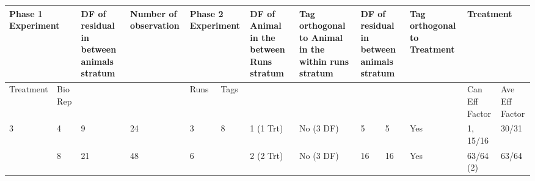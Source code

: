 \noindent 

\begin{tabular}{|p{0.5in}|p{0.3in}|p{0.5in}|p{0.7in}|p{0.3in}|p{0.3in}|p{0.7in}|p{0.7in}|p{0.3in}|p{0.3in}|p{0.6in}|p{0.5in}|p{0.4in}|} \hline 
\multicolumn{2}{|p{1in}|}{Phase 1 Experiment} & DF of residual in between animals stratum & Number of observation  & \multicolumn{2}{|p{0.7in}|}{Phase 2 Experiment} & DF of Animal in the between Runs stratum  & Tag orthogonal to Animal in the within runs stratum & \multicolumn{2}{|p{0.6in}|}{DF of residual in between animals stratum} & Tag orthogonal to Treatment & \multicolumn{2}{|p{0.9in}|}{Treatment} \\ \hline 
Treatment & Bio Rep &  &  & Runs & Tags  &  &  & \multicolumn{2}{|p{0.6in}|}{} &  & Can Eff Factor & Ave Eff Factor \\ \hline 
3 & 4 & 9 & 24 & 3 & 8 & 1 (1 Trt) & No (3 DF) & 5 & 5 & Yes & 1, 15/16 & 30/31 \\ \hline 
 & 8 & 21 & 48 & 6 &  & 2 (2 Trt) & No (3 DF) & 16 & 16 & Yes & 63/64 (2) & 63/64 \\ \hline 
\end{tabular}



\noindent 

\noindent 

\noindent 

\noindent 

